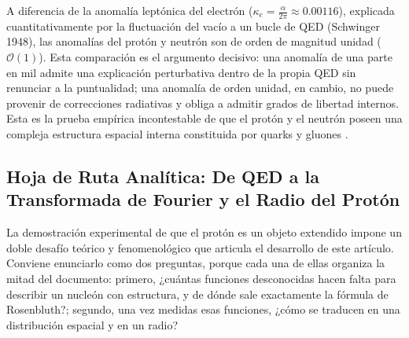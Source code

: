 \documentclass[10pt,a4paper]{article}
\begin{document}
A diferencia de la anomalía leptónica del electrón ($\kappa_e = \frac{\alpha}{2\pi} \approx 0.00116$), explicada cuantitativamente por la fluctuación del vacío a un bucle de QED (Schwinger 1948), las anomalías del protón y neutrón son de orden de magnitud unidad ($\mathcal{O}(1)$). Esta comparación es el argumento decisivo: una anomalía de una parte en mil admite una explicación perturbativa dentro de la propia QED sin renunciar a la puntualidad; una anomalía de orden unidad, en cambio, no puede provenir de correcciones radiativas y obliga a admitir grados de libertad internos. Esta es la prueba empírica incontestable de que el protón y el neutrón poseen una compleja estructura espacial interna constituida por quarks y gluones \cite{henley2007,das2003,pdg2022}.


\subsection{Hoja de Ruta Analítica: De QED a la Transformada de Fourier y el Radio del Protón}
La demostración experimental de que el protón es un objeto extendido impone un doble desafío teórico y fenomenológico que articula el desarrollo de este artículo. Conviene enunciarlo como dos preguntas, porque cada una de ellas organiza la mitad del documento: primero, ¿cuántas funciones desconocidas hacen falta para describir un nucleón con estructura, y de dónde sale exactamente la fórmula de Rosenbluth?; segundo, una vez medidas esas funciones, ¿cómo se traducen en una distribución espacial y en un radio?
\end{document}
